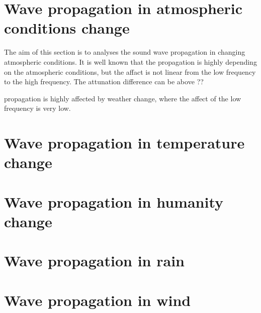 \section{Wave propagation in atmospheric conditions change}
The aim of this section is to analyses the sound wave propagation in changing atmospheric conditions. It is well known that the propagation is highly depending on the atmospheric conditions, but the affact is not linear from the low frequency to the high frequency. The attunation difference can be above  ?? 



propagation is highly affected by weather change, where the affect of the low frequency is very low.  


\section{Wave propagation in temperature change}

\section{Wave propagation in humanity change}

\section{Wave propagation in rain}

\section{Wave propagation in wind}